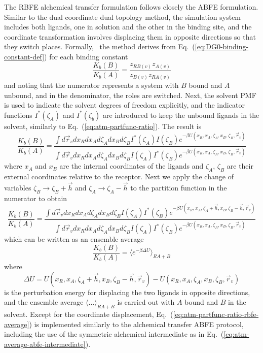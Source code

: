 \documentclass[9pt,bestpractices]{livecoms}
\begin{document}
The RBFE alchemical transfer formulation follows closely the ABFE formulation. Similar to the dual coordinate dual topology method, the simulation system includes both ligands, one in solution and the other in the binding site, and the coordinate transformation involves displacing them in opposite directions so that they switch places. Formally,~\cite{azimi2022relative} the method derives from Eq.~(\ref{eq:DG0-binding-constant-def}) for each binding constant
\begin{equation}
\frac{K_b(B)}{K_b(A)} = \frac{z_{RB(v)} z_{A(v)}}{z_{B(v)} z_{RA(v)}}
\end{equation}
and noting that the numerator represents a system with $B$ bound and $A$ unbound, and in the denominator, the roles are switched. Next, the solvent PMF is used to indicate the solvent degrees of freedom explicitly, and the indicator functions $I^\ast(\zeta_A)$ and $I^\ast(\zeta_b)$ are introduced to keep the unbound ligands in the solvent, similarly to Eq.~(\ref{eq:atm-partfunc-ratio}). The result is
\begin{equation}\label{eq:atm-partfunc-ratio-rbfe-1}
  \frac{K_b(B)}{K_b(A)} = \frac{
    \int d\vec{r}_v dx_R dx_A d\zeta_A dx_B d\zeta_B I^\ast(\zeta_A) I(\zeta_B)  e^{-\beta U(x_R, x_A, \zeta_A, x_B, \zeta_B, \vec{r}_v)}
  }{
    \int d\vec{r}_v dx_R dx_A d\zeta_A dx_B d\zeta_B I(\zeta_A) I^\ast(\zeta_B)  e^{-\beta U(x_R, x_A, \zeta_A, x_B, \zeta_B, \vec{r}_v)}
  }
\end{equation}
where $x_A$ and $x_B$ are the internal coordinates of the ligands and $\zeta_A$, $\zeta_B$ are their external coordinates relative to the receptor.  Next we apply the change of variables $\zeta_B \rightarrow \zeta_B + \vec{h}$ and $\zeta_A \rightarrow \zeta_A - \vec{h}$ to the partition function in the numerator to obtain
\begin{equation}\label{eq:atm-partfunc-ratio-rbfe-2}
  \frac{K_b(B)}{K_b(A)} = \frac{
    \int d\vec{r}_v dx_R dx_A d\zeta_A dx_B d\zeta_B I(\zeta_A) I^\ast(\zeta_B)  e^{-\beta U(x_R, x_A, \zeta_A + \vec{h}, x_B, \zeta_B - \vec{h}, \vec{r}_v)}
  }{
    \int d\vec{r}_v dx_R dx_A d\zeta_A dx_B d\zeta_B I(\zeta_A) I^\ast(\zeta_B)  e^{-\beta U(x_R, x_A, \zeta_A, x_B, \zeta_B, \vec{r}_v)}
  }
\end{equation}
which can be written as an ensemble average
\begin{equation}\label{eq:atm-partfunc-ratio-rbfe-average}
\frac{K_b(B)}{K_b(A)} = \langle e^{-\beta \Delta U}\rangle_{RA+B}
\end{equation}
where
\begin{equation}\label{eq:atm-partfunc-ratio-rbfe-pert}
\Delta U = U(x_R, x_A, \zeta_A + \vec{h}, x_B, \zeta_B - \vec{h}, \vec{r}_v) - U(x_R, x_A, \zeta_A, x_B, \zeta_B, \vec{r}_v)
\end{equation}
is the perturbation energy for displacing the two ligands in opposite directions, and the ensemble average $\langle \ldots \rangle_{RA+B}$ is carried out with $A$ bound and $B$ in the solvent. Except for the coordinate displacement, Eq.~(\ref{eq:atm-partfunc-ratio-rbfe-average}) is implemented similarly to the alchemical transfer ABFE protocol, including the use of the symmetric alchemical intermediate as in Eq.~(\ref{eq:atm-average-abfe-intermediate}).
\end{document}
